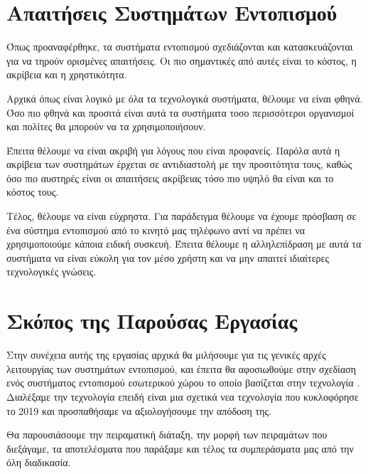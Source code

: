 \section{Απαιτήσεις Συστημάτων Εντοπισμού}
Όπως προαναφέρθηκε, τα συστήματα εντοπισμού σχεδιάζονται και κατασκευάζονται για να τηρούν ορισμένες απαιτήσεις. Οι πιο σημαντικές από αυτές είναι το κόστος,
η ακρίβεια και η χρηστικότητα.

Αρχικά όπως είναι λογικό με όλα τα τεχνολογικά συστήματα, θέλουμε να είναι φθηνά. Όσο πιο φθηνά και προσιτά είναι αυτά τα συστήματα τοσο περισσότεροι οργανισμοί
και πολίτες θα μπορούν να τα χρησιμοποιήσουν.

Έπειτα θέλουμε να είναι ακριβή για λόγους που είναι προφανείς. Παρόλα αυτά η ακρίβεια των συστημάτων έρχεται σε αντιδιαστολή με την προσιτότητα τους, καθώς
όσο πιο αυστηρές είναι οι απαιτήσεις ακρίβειας τόσο πιο υψηλό θα είναι και το κόστος τους.

Τέλος, θέλουμε να είναι εύχρηστα. Για παράδειγμα θέλουμε να έχουμε πρόσβαση σε ένα σύστημα εντοπισμού από το κινητό μας τηλέφωνο αντί να πρέπει να χρησιμοποιούμε
κάποια ειδική συσκευή. Έπειτα θέλουμε η αλληλεπίδραση με αυτά τα συστήματα να είναι εύκολη για τον μέσο χρήστη και να μην απαιτεί ιδιαίτερες τεχνολογικές γνώσεις.
\section{Σκόπος της Παρούσας Εργασίας}
Στην συνέχεια αυτής της εργασίας αρχικά θα μιλήσουμε για τις γενικές αρχές λειτουργίας των συστημάτων εντοπισμού, και έπειτα θα αφοσιωθούμε στην σχεδίαση
ενός συστήματος εντοπισμού εσωτερικού χώρου το οποίο βασίζεται στην τεχνολογία . Διαλέξαμε την τεχνολογία  επειδή είναι μια
σχετικά νεα τεχνολογία που κυκλοφόρησε το 2019 και προσπαθήσαμε να αξιολογήσουμε την απόδοση της.

Θα παρουσιάσουμε την πειραματική διάταξη, την μορφή των πειραμάτων που διεξάγαμε, τα αποτελέσματα που παράξαμε και τέλος τα συμπεράσματα μας από την όλη
διαδικασία.

